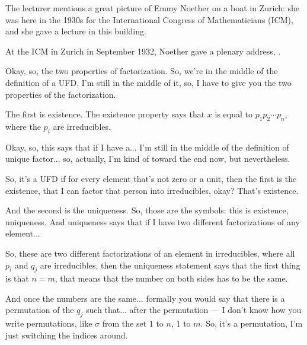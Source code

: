 \begin{insight}
The lecturer mentions a great picture of Emmy Noether on a boat in Zurich: she was here in the 1930s for the International Congress of Mathematicians (ICM), and she gave a lecture in this building.
\end{insight}

\begin{aiNote}
At the ICM in Zurich in September 1932, Noether gave a plenary address, .
\end{aiNote}

\begin{speech}[00:11:55 - 00:14:32]
Okay, so, the two properties of factorization. So, we're in the middle of the definition of a UFD, I'm still in the middle of it, so, I have to give you the two properties of the factorization.

The first is existence.  The existence property says that $x$  is equal to $p_1 p_2 \cdots p_n$, where  the $p_i$ are irreducibles.

Okay, so, this says that if I have a... I'm still in the middle of the definition of unique factor... so, actually, I'm kind of toward the end now, but nevertheless.

So, it's a UFD if for every element that's not zero or a unit, then the first is the existence, that I can factor that person into irreducibles, okay? That's existence.

And the second is the uniqueness.  So, those are the symbols: this is existence, uniqueness. And uniqueness says that if I have two different factorizations of any element... 

So, these are two different factorizations of an element in irreducibles, where all $p_i$ and $q_j$  are irreducibles, then  the uniqueness statement says that the first thing is that $n = m$,  that means that the number on both sides has to be the same.

And once the numbers are the same... formally you would say that there is a permutation  of the $q_j$ such that... after the permutation --- I don't know how you write permutations, like $\sigma$ from the set $1$ to $n$,  $1$ to $m$. So, it's a permutation, I'm just switching the indices around.


\end{speech}
